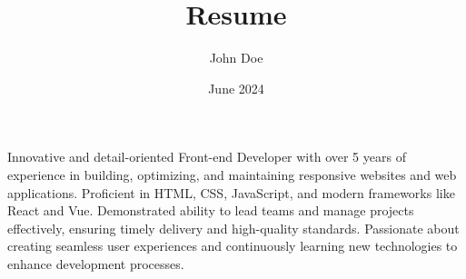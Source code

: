 \documentclass{my_cv}
\title{Resume}
\author{John Doe}
\date{June 2024}
\begin{document}
\begin{multicols}{3}
    \columnbreak
    \columnbreak
\end{multicols}

\begin{multicols}{2}

    \columnbreak
    \begin{spacing}{1.5}
        Innovative and detail-oriented Front-end Developer with over 5 years of experience in building, optimizing, and maintaining responsive websites and web applications. Proficient in HTML, CSS, JavaScript, and modern frameworks like React and Vue. Demonstrated ability to lead teams and manage projects effectively, ensuring timely delivery and high-quality standards. Passionate about creating seamless user experiences and continuously learning new technologies to enhance development processes.
    \end{spacing}
\end{multicols}

\vspace{1em}
\setlength{\columnsep}{1cm}
\end{document}
